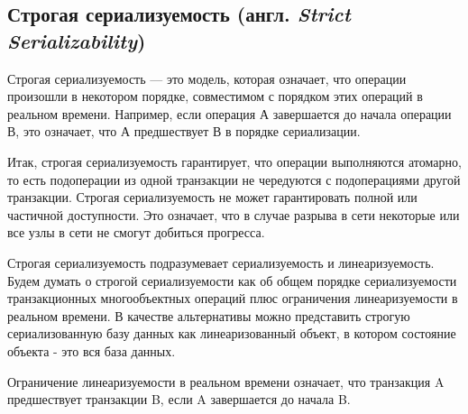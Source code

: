 \documentclass[12pt,  openany]{book}
\begin{document}
\subsection{Строгая сериализуемость (англ.  \textit{Strict Serializability})}
Строгая сериализуемость --- это  модель, которая означает, что операции произошли в некотором порядке, совместимом с порядком этих операций в реальном времени. Например, если операция А завершается до начала операции В, это означает, что А предшествует В в порядке сериализации.
\par
Итак, строгая сериализуемость гарантирует, что операции выполняются атомарно, то есть подоперации из одной транзакции не чередуются с подоперациями другой транзакции.
Строгая сериализуемость не может гарантировать полной или частичной доступности. Это означает, что в случае разрыва в сети некоторые или все узлы в сети не смогут добиться прогресса.
\par
Строгая сериализуемость подразумевает сериализуемость и линеаризуемость.  Будем думать о строгой сериализуемости как об общем порядке сериализуемости транзакционных многообъектных операций плюс ограничения линеаризуемости в реальном времени. В качестве альтернативы можно представить строгую сериализованную базу данных как линеаризованный объект, в котором состояние объекта - это вся база данных.
\par
Ограничение линеаризуемости в реальном времени означает, что транзакция A предшествует транзакции B, если A завершается до начала B.
\end{document}
